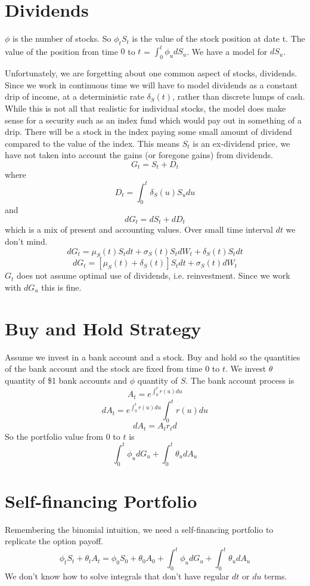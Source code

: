 
\section{Dividends}

$\phi$ is the number of stocks. So $\phi_t S_t$ is the value of the stock
position at date t. The value of the position from time $0$ to $t$ =
$\int_0^t \phi_u dS_u$. We have a model for $dS_u$.

Unfortunately, we are forgetting about one common aspect of stocks, dividends.
Since we work in continuous time we will have to model dividends as a
constant drip of income, at a deterministic rate $\delta_S(t)$,  rather than
discrete lumps of cash. While this is not all that realistic for individual
stocks, the model does make sense for a security such as an index fund which
would pay out in something of a drip. There will be a stock in the index
paying some small amount of dividend compared to the value of the index. This
means $S_t$ is an ex-dividend price, we have not taken into account the gains
(or foregone gains) from dividends.
\[G_t=S_t+D_t\]
where
\[D_t=\int_0^t \delta_S(u)S_udu\]
and
\[dG_t=dS_t+dD_t\]
which is a mix of present and accounting values. Over small time interval
$dt$ we don't mind.
\[dG_t=\mu_S(t)S_tdt+\sigma_S(t)S_tdW_t+\delta_S(t)S_tdt\]
\[dG_t=\left[ \mu_S(t)+\delta_S(t) \right] S_tdt+\sigma_S(t)dW_t\]
$G_t$ does not assume optimal use of dividends, i.e. reinvestment. Since we
work with $dG_u$ this is fine.

\section{Buy and Hold Strategy}

Assume we invest in a bank account and a stock. Buy and hold so the quantities
of the bank account and the stock are fixed from time $0$ to $t$. We invest
$\theta$ quantity of \$1 bank accounts and $\phi$ quantity of $S$. The bank
account process is
\[A_t=e^{\int_0^t r(u)du}\]
\[dA_t=e^{\int_0^t r(u)du} \int_0^t r(u)du\]
\[dA_t=A_tr_td\]
So the portfolio value from $0$ to $t$ is
\[\int_0^t \phi_u dG_u + \int_0^t \theta_udA_u\]

\section{Self-financing Portfolio}

Remembering the binomial intuition, we need a self-financing portfolio to
replicate the option payoff.
\begin{equation} \label{replport}
    \phi_tS_t+\theta_tA_t=\phi_0S_0+\theta_0A_0+ \int_0^t \phi_u dG_u +
    \int_0^t \theta_udA_u
\end{equation}
We don't know how to solve integrals that don't have regular $dt$ or $du$
terms.
